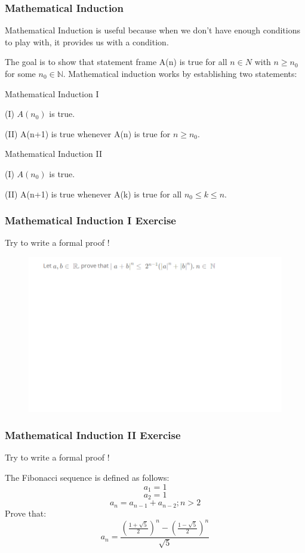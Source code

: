\documentclass{beamer}
\begin{document}
\begin{frame}
    \frametitle{Mathematical Induction}
    Mathematical Induction is useful because when we don't have enough conditions to play with, it provides us with a condition.

    \vspace{0.7em}
    The goal is to show that statement frame A(n) is true for all $n\in N$ with $n\geq n_{0}$ for some $n_{0}\in \mathbb{N}$.
    Mathematical induction works by establishing two statements:

    \vspace{1em}
    Mathematical Induction I

    (I) $A(n_{0})$ is true.

    (II) A(n+1) is true whenever A(n) is true for $n\geq n_{0}$.

    \vspace{2em}
    Mathematical Induction II

    (I) $A(n_{0})$ is true.

    (II) A(n+1) is true whenever A(k) is true for all $n_{0}\leq k\leq n$.
    \vspace{1em}
\end{frame}

\begin{frame}
    \frametitle{Mathematical Induction I Exercise}
    Try to write a formal proof !

    \begin{figure}[htbp]
        \centering
        \includegraphics[width=12cm]{exercise4.png}
    \end{figure}
\end{frame}

\begin{frame}
    \frametitle{Mathematical Induction II Exercise}
    Try to write a formal proof !

    \vspace{1em}
    The Fibonacci sequence is defined as follows:
    $$a_1=1$$
    $$a_2=1$$
    $$a_n=a_{n-1}+a_{n-2};n>2$$
    Prove that:
    $$a_n=\frac{(\frac{1+\sqrt{5}}{2})^n-(\frac{1-\sqrt{5}}{2})^n}{\sqrt{5}}$$
\end{frame}
\end{document}
